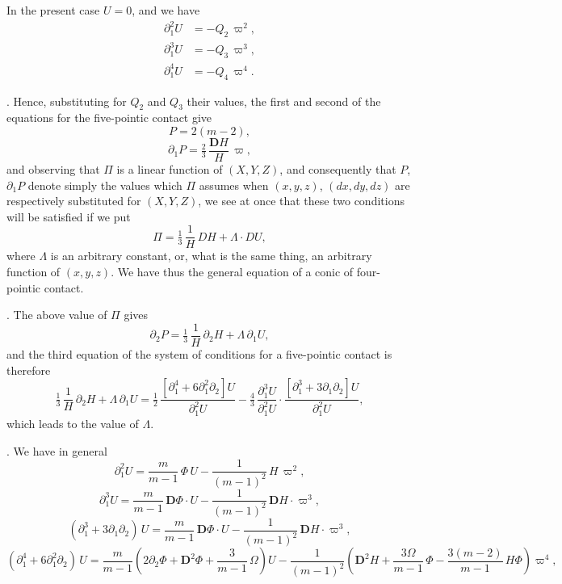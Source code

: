 \documentclass[11pt]{article}
\begin{document}
\medskip

\noindent In the present case $U = 0$, and we have
\[
\begin{aligned}
\partial_1^2 U &= -Q_2\,\varpi^2,\\
\partial_1^3 U &= -Q_3\,\varpi^3,\\
\partial_1^4 U &= -Q_4\,\varpi^4.
\end{aligned}
\]

\medskip

. Hence, substituting for $Q_2$ and $Q_3$ their values, the first and second of the equations for the five-pointic contact give
\[
P = 2(m - 2),
\]
\[
\partial_1 P = \tfrac{2}{3}\,\frac{\mathbf{D}H}{H}\,\varpi,
\]
and observing that $\Pi$ is a linear function of $(X, Y, Z)$, and consequently that $P$, $\partial_1 P$ denote simply the values which $\Pi$ assumes when $(x, y, z)$, $(dx, dy, dz)$ are respectively substituted for $(X, Y, Z)$, we see at once that these two conditions will be satisfied if we put
\[
\Pi = \tfrac{1}{3}\,\frac{1}{H}\,DH + \Lambda \cdot DU,
\]
where $\Lambda$ is an arbitrary constant, or, what is the same thing, an arbitrary function of $(x, y, z)$. We have thus the general equation of a conic of four-pointic contact.

\medskip

. The above value of $\Pi$ gives
\[
\partial_2 P = \tfrac{1}{3}\,\frac{1}{H}\,\partial_2 H + \Lambda\,\partial_1 U,
\]
and the third equation of the system of conditions for a five-pointic contact is therefore
\[
\tfrac{1}{3}\,\frac{1}{H}\,\partial_2 H + \Lambda\,\partial_1 U
   = \tfrac{1}{2}\,\frac{[\partial_1^4 + 6\partial_1^2\partial_2]U}{\partial_1^2 U}
   - \tfrac{4}{3}\,\frac{\partial_1^3 U}{\partial_1^2 U}\cdot\frac{[\partial_1^3 + 3\partial_1\partial_2]U}{\partial_1^2 U},
\]
which leads to the value of $\Lambda$.

\medskip

. We have in general
\[
\partial_1^2 U = \frac{m}{m - 1}\,\Phi\,U - \frac{1}{(m - 1)^2}\,H\,\varpi^2,
\]
\[
\partial_1^3 U = \frac{m}{m - 1}\,\mathbf{D}\Phi \cdot U - \frac{1}{(m - 1)^2}\,\mathbf{D}H \cdot \varpi^3,
\]
\[
(\partial_1^3 + 3\partial_1\partial_2)\,U = \frac{m}{m - 1}\,\mathbf{D}\Phi \cdot U - \frac{1}{(m - 1)^2}\,\mathbf{D}H \cdot \varpi^3,
\]
\[
(\partial_1^4 + 6\partial_1^2\partial_2)\,U = \frac{m}{m - 1}\left(2\partial_2\Phi + \mathbf{D}^2\Phi + \frac{3}{m - 1}\,\Omega\right)U
   - \frac{1}{(m - 1)^2}\!\left(\mathbf{D}^2 H + \frac{3\Omega}{m - 1}\,\Phi - \frac{3(m - 2)}{m - 1}\,H\Phi\right)\varpi^4,
\]
\end{document}

